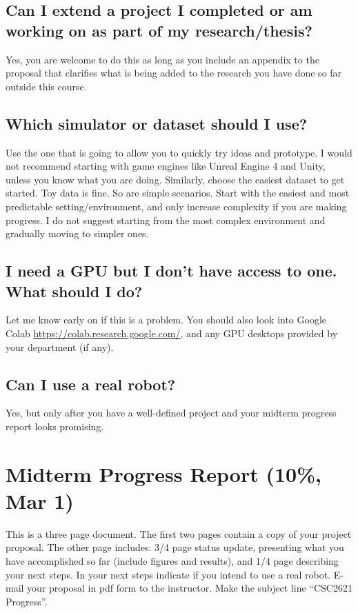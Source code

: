 \documentclass[a4paper,10pt]{article}
\begin{document}
\subsection{Can I extend a project I completed or am working on as part of my research/thesis?}
Yes, you are welcome to do this as long as you include an appendix to the proposal that clarifies what is being added to the research you have done so far outside this course.  

\subsection{Which simulator or dataset should I use?}
Use the one that is going to allow you to quickly try ideas and prototype. I would not recommend starting with game engines like Unreal Engine 4 and Unity, unless you know what you are doing.
Similarly, choose the easiest dataset to get started. Toy data is fine. So are simple scenarios. Start with the easiest and most predictable setting/environment, and only increase complexity 
if you are making progress. I do not suggest starting from the most complex environment and gradually moving to simpler ones.

\subsection{I need a GPU but I don't have access to one. What should I do?}
Let me know early on if this is a problem. You should also look into Google Colab \url{https://colab.research.google.com/}, and any GPU desktops provided by your department (if any). 

\subsection{Can I use a real robot?}
Yes, but only after you have a well-defined project and your midterm progress report looks promising.  

\section{Midterm Progress Report (10\%, Mar 1)}
This is a three page document. The first two pages contain a copy of your project proposal. The other page includes: 3/4 page status update, presenting what you have accomplished so far (include figures 
and results), and 1/4 page describing your next steps. In your next steps indicate if you intend to use a real robot. E-mail your proposal in pdf form to the instructor. Make the subject line ``CSC2621 Progress''.  
    
\end{document}
